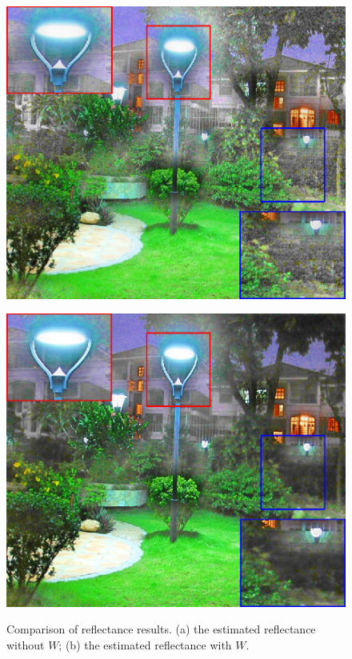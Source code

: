 \begin{figure}[t]
\centering
\begin{minipage}[b]{0.49\hsize}
\centering
\includegraphics[height=0.65\hsize]{images/noise/mlv_wo.eps}
 \label{fig:wo}
\end{minipage}
\begin{minipage}[b]{0.49\hsize}
\centering
\includegraphics[height=0.65\hsize]{images/noise/mlv_reflectance.eps}
 \label{fig:w}
\end{minipage}
\caption{Comparison of reflectance results. (a) the estimated reflectance without $W$; (b) the estimated reflectance with $W$.}
\label{fig: noise_suppression}
\end{figure}


